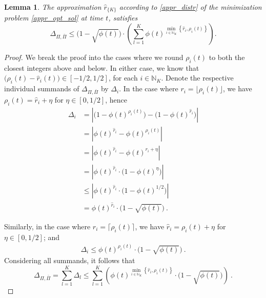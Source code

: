 \documentclass[journal,letterpaper,onecolumn,twoside,nofonttune]{IEEEtran}
\newcommand{\N}{\mathbb{N}}
\newcommand{\rh}{\hat{r}}
\newcommand{\Pib}{\bar{\Pi}}
\newtheorem{Lemma}{Lemma}
\begin{document}
\begin{Lemma}
\label{appr_err_rounding}
The approximation $\rh_{\{K\}}$ according to \eqref{appr_distr} of the minimization problem \eqref{appr_opt_sol} at time $t$, satisfies
$$ \Delta_{\Pi,\Pib}\leqslant\Big(1-\sqrt{\phi(t)}\Big)\cdot\left(\sum_{l=1}^K\phi(t)^{\min\limits_{i\in\N_K}\left\{\rh_i,\rho_i(t)\right\}}\right). $$
\end{Lemma}

\begin{proof}
We break the proof into the cases where we round $\rho_i(t)$ to both the closest integers above and below. In either case, we know that $\big(\rho_i(t)-\rh_i(t)\big)\in[-1/2,1/2]$, for each $i\in\N_K$. Denote the respective individual summands of $\Delta_{\Pi,\Pib}$ by $\Delta_i$. In the case where $r_i=\lfloor\rho_i(t)\rfloor$, we have $\rho_i(t)=\rh_i+\eta$ for $\eta\in[0,1/2]$, hence
\begin{align*}
  \Delta_i &= \left|\big(1-\phi(t)^{\rho_i(t)}\big)-\big(1-\phi(t)^{\rh_i}\big)\right| \\
  &= \left|\phi(t)^{\rh_i}-\phi(t)^{\rho_i(t)}\right| \\
  &= \left|\phi(t)^{\rh_i}-\phi(t)^{r_i+\eta}\right| \\
  &= \left|\phi(t)^{\rh_i}\cdot\big(1-\phi(t)^\eta\big)\right| \\
  &\leqslant \left|\phi(t)^{\rh_i}\cdot\big(1-\phi(t)^{1/2}\big)\right| \\
  &= \phi(t)^{\rh_i} \cdot \Big(1-\sqrt{\phi(t)}\Big)\ .
\end{align*}

Similarly, in the case where $r_i=\lceil\rho_i(t)\rceil$, we have $\rh_i=\rho_i(t)+\eta$ for $\eta\in[0,1/2]$; and
\begin{align*}
  \Delta_i \leqslant \phi(t)^{\rho_i(t)} \cdot \Big(1-\sqrt{\phi(t)}\Big)\ .  
\end{align*}
Considering all summands, it follows that
$$ \Delta_{\Pi,\Pib} = \sum_{l=1}^K \Delta_l \leqslant \sum_{l=1}^K\left(\phi(t)^{\min\limits_{i\in\N_K}\left\{\rh_i,\rho_i(t)\right\}} \cdot \Big(1-\sqrt{\phi(t)}\Big)\right)\ . $$
\end{proof}
\end{document}
